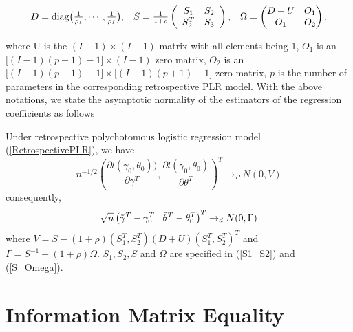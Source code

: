 \documentclass[12]{interact}
\theoremstyle{plain}%
\theoremstyle{definition}
\theoremstyle{remark}
\begin{document}
\begin{equation}
	\begin{array}{ccc} D=\mbox{diag} \big(\frac{1}{\rho_1}, \cdots, \frac{1}{\rho_{I}}  \big),
		&S=\frac{1}{1+\rho}\left(\begin{array}{cc} S_1 & S_2 \\
			S_{2}^T & S_3 \end{array} \right), & \Omega=\begin{pmatrix}
			D+U&O_1\cr O_1&O_2\end{pmatrix}.
	\end{array}\label{S_Omega}
\end{equation}

where U is the $(I-1)\times(I-1)$ matrix with all elements being 1, $O_1$ is an $\big[(I-1)(p+1)-1\big]\times (I-1)$ zero matrix, $O_2$ is an $\big[(I-1)(p+1)-1\big]\times \big[(I-1)(p+1)-1\big]$ zero matrix, $p$ is the number of parameters in the corresponding retrospective PLR model. With the above notations, we state the asymptotic normality of the estimators of the regression coefficients as follows

{\theorem \citep{ZhangBiao-JMA-2002, ZhangBiao-AustrNZJS-2004, Peng-Zhang-JSPI-2008} Under retrospective polychotomous logistic regression model (\ref{RetrospectivePLR}), we have
	$$n^{-1/2}\left( \frac{\partial l(\gamma_0, \theta_0))}{\partial \gamma^T},\frac{\partial l(\gamma_0, \theta_0)}{\partial \theta^T} \right)^T \rightarrow_P N(0,V) $$
	consequently,
	$$\sqrt{n}\left( \tilde{\gamma}^T-\gamma_0^T \hspace{3mm} \tilde{\theta}^T-\theta_0^T \right)^T \rightarrow_d N(0,\Gamma)$$
	\noindent where $V=S-(1+\rho)(S_1^T, S_2^T)(D+U)(S_1^T, S_2^T)^T$ and $\Gamma=S^{-1}-(1+\rho)\Omega$. $S_1, S_2, S$ and $\Omega$ are specified in (\ref{S1_S2}) and (\ref{S_Omega}).}

\section{Information Matrix Equality}\label{sec3}
\end{document}
